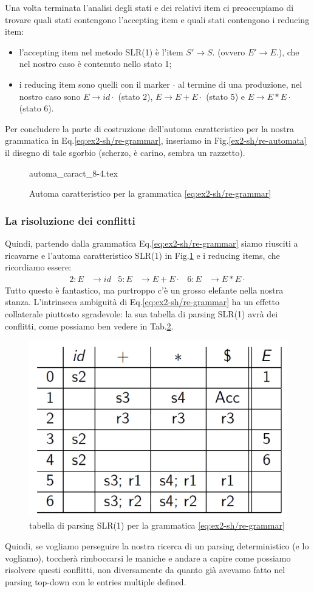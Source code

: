 \documentclass[class=book, crop=false, oneside, 12pt]{standalone}
\begin{document}
Una volta terminata l'analisi degli stati e dei relativi item ci preoccupiamo di trovare quali stati contengono l'accepting item e quali stati contengono i reducing item:
\begin{itemize}
    \item l'accepting item nel metodo SLR(1) è l'item \(S' \to S.\) (ovvero \(E' \to E.\)), che nel nostro caso è contenuto nello stato 1;
    \item i reducing item sono quelli con il marker \(\cdot\) al termine di una produzione, nel nostro caso sono \(E \to id \cdot\) (stato 2), \(E \to E+E \cdot\) (stato 5) e \(E \to E*E \cdot\) (stato 6).
\end{itemize}

Per concludere la parte di costruzione dell'automa caratteristico per la nostra grammatica in Eq.\ref{eq:ex2-sh/re-grammar}, inseriamo in Fig.\ref{ex2-sh/re-automata} il disegno di tale sgorbio (scherzo, è carino, sembra un razzetto).
\begin{figure}[H]
    \center
	{automa_caract_8-4.tex}
    \caption{Automa caratteristico per la grammatica \ref{eq:ex2-sh/re-grammar}}
    \label{fig:ex2-sh/re-automata}
\end{figure}

\subsubsection{La risoluzione dei conflitti}
Quindi, partendo dalla grammatica Eq.\ref{eq:ex2-sh/re-grammar} siamo riusciti a ricavarne e l'automa caratteristico SLR(1) in Fig.\ref{fig:ex2-sh/re-automata} e i reducing items, che ricordiamo essere:
\begin{align*}
    2: E &\to id & 5: E &\to E + E \cdot & 6: E &\to E * E \cdot
\end{align*}
Tutto questo è fantastico, ma purtroppo c'è un grosso elefante nella nostra stanza. L'intrinseca ambiguità di Eq.\ref{eq:ex2-sh/re-grammar} ha un effetto collaterale piuttosto sgradevole: la sua tabella di parsing SLR(1) avrà dei conflitti, come possiamo ben vedere in Tab.\ref{tab:ex2-sh/re-table}.
\begin{figure}[H]
    \center
    \includegraphics[width=.6\textwidth]{ex2-sh_re-table.png}
    \caption{tabella di parsing SLR(1) per la grammatica \ref{eq:ex2-sh/re-grammar}}
    \label{tab:ex2-sh/re-table}
\end{figure}
\noindent Quindi, se vogliamo perseguire la nostra ricerca di un parsing deterministico (e lo vogliamo), toccherà rimboccarsi le maniche e andare a capire come possiamo risolvere questi conflitti, non diversamente da quanto già avevamo fatto nel parsing top-down con le entries multiple defined.
\end{document}
